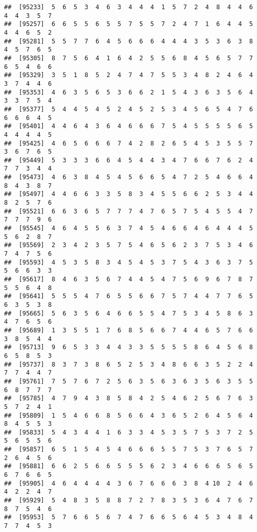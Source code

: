 \documentclass[
]{book}
\begin{document}
\begin{verbatim}
##  [95233]  5  6  5  3  4  6  3  4  4  4  1  5  7  2  4  8  4  4  6  4  4  3  5  7
##  [95257]  6  6  5  5  6  5  5  7  5  5  7  2  4  7  1  6  4  4  5  4  4  6  5  2
##  [95281]  5  5  7  7  6  4  5  6  6  6  4  4  4  3  5  3  6  3  8  4  5  7  6  5
##  [95305]  8  7  5  6  4  1  6  4  2  5  5  6  8  4  5  6  5  7  7  6  5  4  6  6
##  [95329]  3  5  1  8  5  2  4  7  4  7  5  5  3  4  8  2  4  6  4  3  7  4  4  6
##  [95353]  4  6  3  5  6  5  3  6  6  2  1  5  4  3  6  3  5  6  4  3  3  7  5  4
##  [95377]  5  4  4  5  4  5  2  4  5  2  5  3  4  5  6  5  4  7  6  6  6  6  4  5
##  [95401]  4  4  6  4  3  6  4  6  6  6  7  5  4  5  5  5  5  6  5  4  4  4  4  5
##  [95425]  4  6  5  6  6  6  7  4  2  8  2  6  5  4  5  3  5  5  7  3  6  7  6  5
##  [95449]  5  3  3  3  6  6  4  5  4  4  3  4  7  6  6  7  6  2  4  7  7  3  4  4
##  [95473]  4  6  3  8  4  5  4  5  6  6  5  4  7  2  5  4  6  6  4  8  4  3  8  7
##  [95497]  4  4  6  6  3  3  5  8  3  4  5  5  6  6  2  5  3  4  4  8  2  5  7  6
##  [95521]  6  6  3  6  5  7  7  7  4  7  6  5  7  5  4  5  5  4  7  7  7  7  9  6
##  [95545]  4  6  4  5  5  6  3  7  4  5  4  6  6  4  6  4  4  4  5  5  6  2  8  7
##  [95569]  2  3  4  2  3  5  7  5  4  6  5  6  2  3  7  5  3  4  6  7  4  7  5  6
##  [95593]  4  5  3  5  8  3  4  5  4  5  3  7  5  4  3  6  3  7  5  5  6  6  3  3
##  [95617]  8  4  6  3  5  6  7  4  4  5  4  7  5  6  9  6  7  8  7  5  5  6  4  8
##  [95641]  5  5  5  4  7  6  5  5  6  6  7  5  7  4  4  7  7  6  5  6  3  5  3  8
##  [95665]  5  6  3  5  6  4  6  6  5  5  4  7  5  3  4  5  8  6  3  4  7  6  5  6
##  [95689]  1  3  5  5  1  7  6  8  5  6  6  7  4  4  6  5  7  6  6  3  8  5  4  4
##  [95713]  9  6  5  3  3  4  4  3  3  5  5  5  5  8  6  4  5  6  8  6  5  8  5  3
##  [95737]  8  3  7  3  8  6  5  2  5  3  4  8  6  6  3  5  2  2  4  7  7  4  4  7
##  [95761]  7  5  7  6  7  2  5  6  3  5  6  3  6  3  5  6  3  5  5  6  8  7  7  7
##  [95785]  4  7  9  4  3  8  5  8  4  2  5  4  6  2  5  6  7  6  3  5  7  2  4  1
##  [95809]  1  5  4  6  6  8  5  6  6  4  3  6  5  2  6  4  5  6  4  8  4  5  5  3
##  [95833]  5  4  3  4  4  1  6  3  3  4  5  3  5  7  5  3  7  2  5  5  6  5  5  6
##  [95857]  6  5  1  5  4  5  4  6  6  6  5  5  7  5  3  7  6  5  7  2  6  4  5  6
##  [95881]  6  6  2  5  6  6  5  5  5  6  2  3  4  6  6  6  5  6  5  6  7  6  6  5
##  [95905]  4  6  4  4  4  4  3  6  7  6  6  6  3  8  4 10  2  4  6  4  2  2  4  7
##  [95929]  5  4  8  3  5  8  8  7  2  7  8  3  5  3  6  4  7  6  7  8  7  5  4  6
##  [95953]  5  7  6  6  5  6  7  4  7  6  6  5  6  4  5  3  4  8  4  7  7  4  5  3

\end{verbatim}
\end{document}
